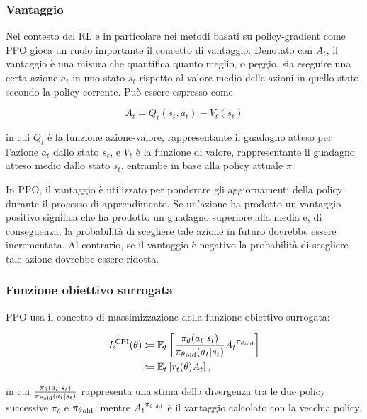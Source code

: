 \subsubsection{Vantaggio} Nel contesto del RL e in particolare nei metodi basati su policy-gradient come PPO gioca un ruolo importante il concetto di vantaggio. Denotato con $A_t$, il vantaggio è una misura che quantifica quanto meglio, o peggio, sia eseguire una certa azione $a_t$ in uno stato $s_t$ rispetto al valore medio delle azioni in quello stato secondo la policy corrente. Può essere espresso come

\begin{equation}
    A_t = Q_t(s_t, a_t) - V_t(s_t)
\end{equation}

in cui $Q_t$ è la funzione azione-valore, rappresentante il guadagno atteso per l'azione $a_t$ dallo stato $s_t$, e $V_t$ è la funzione di valore, rappresentante il guadagno atteso medio dallo stato $s_t$, entrambe in base alla policy attuale $\pi$.

In PPO, il vantaggio è utilizzato per ponderare gli aggiornamenti della policy durante il processo di apprendimento. Se un’azione ha prodotto un vantaggio positivo significa che ha prodotto un guadagno superiore alla media e, di conseguenza, la probabilità di scegliere tale azione in futuro dovrebbe essere incrementata. Al contrario, se il vantaggio è negativo la probabilità di scegliere tale azione dovrebbe essere ridotta.

\subsubsection{Funzione obiettivo surrogata} PPO usa il concetto di massimizzazione della funzione obiettivo surrogata:

\begin{align}
    L^{\textnormal{CPI}}(\theta) &\coloneqq \mathbb{E}_t \left[ \frac{\pi_\theta(a_t | s_t)}{{\pi_\theta}_\textnormal{old}(a_t | s_t)} {A_t}^{{\pi_\theta}_\textnormal{old}} \right] \label{eq:2_ppo_surrogate_objective_full} \\
    &\coloneqq \mathbb{E}_t \left[ r_t(\theta) A_t \right], \label{eq:2_ppo_surrogate_objective}
\end{align}

in cui $\frac{\pi_\theta(a_t | s_t)}{{\pi_\theta}_\textnormal{old}(a_t | s_t)}$ rappresenta una stima della divergenza tra le due policy successive ${\pi_\theta}$ e ${\pi_\theta}_\textnormal{old}$, mentre ${A_t}^{{\pi_\theta}_\textnormal{old}}$ è il vantaggio calcolato con la vecchia policy.

